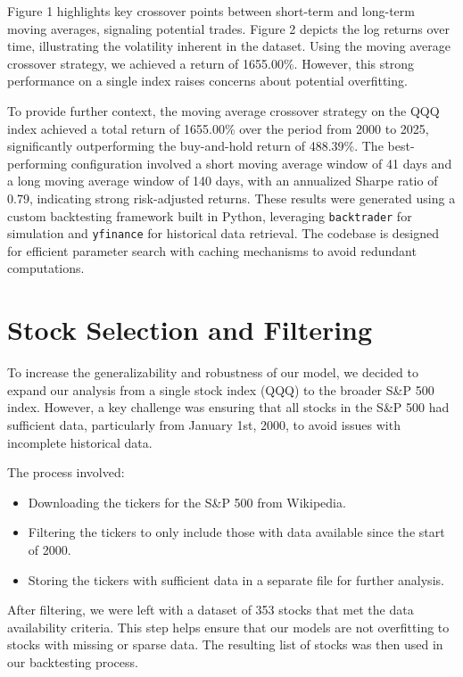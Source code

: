 \documentclass{article}
\begin{document}
Figure 1 highlights key crossover points between short-term and long-term moving averages, signaling potential trades. Figure 2 depicts the log returns over time, illustrating the volatility inherent in the dataset. Using the moving average crossover strategy, we achieved a return of 1655.00\%. However, this strong performance on a single index raises concerns about potential overfitting.

To provide further context, the moving average crossover strategy on the QQQ index achieved a total return of 1655.00\% over the period from 2000 to 2025, significantly outperforming the buy-and-hold return of 488.39\%. The best-performing configuration involved a short moving average window of 41 days and a long moving average window of 140 days, with an annualized Sharpe ratio of 0.79, indicating strong risk-adjusted returns. These results were generated using a custom backtesting framework built in Python, leveraging \texttt{backtrader} for simulation and \texttt{yfinance} for historical data retrieval. The codebase is designed for efficient parameter search with caching mechanisms to avoid redundant computations.





\section{Stock Selection and Filtering}

To increase the generalizability and robustness of our model, we decided to expand our analysis from a single stock index (QQQ) to the broader S\&P 500 index. However, a key challenge was ensuring that all stocks in the S\&P 500 had sufficient data, particularly from January 1st, 2000, to avoid issues with incomplete historical data. 

The process involved:
\begin{itemize}
    \item Downloading the tickers for the S\&P 500 from Wikipedia.
    \item Filtering the tickers to only include those with data available since the start of 2000.
    \item Storing the tickers with sufficient data in a separate file for further analysis.
\end{itemize}

After filtering, we were left with a dataset of 353 stocks that met the data availability criteria. This step helps ensure that our models are not overfitting to stocks with missing or sparse data. The resulting list of stocks was then used in our backtesting process.
\end{document}
